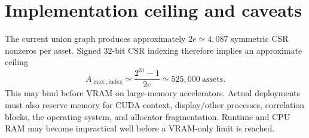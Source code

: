 \documentclass[10pt,a4paper]{article}
\begin{document}
\section*{Implementation ceiling and caveats}

The current union graph produces approximately $2e\simeq4{,}087$ symmetric CSR
nonzeros per asset.  Signed 32-bit CSR indexing therefore implies an approximate
ceiling
\begin{equation}
  A_{\max,\mathrm{index}}
  \simeq \frac{2^{31}-1}{2e}
  \simeq 525{,}000\ \text{assets}.
\end{equation}
This may bind before VRAM on large-memory accelerators.  Actual deployments
must also reserve memory for CUDA context, display/other processes, correlation
blocks, the operating system, and allocator fragmentation.  Runtime and CPU
RAM may become impractical well before a VRAM-only limit is reached.
\end{document}
